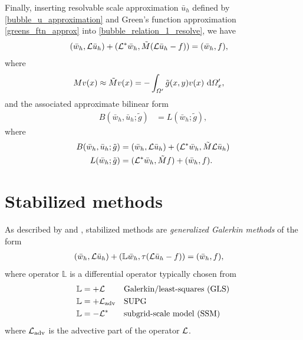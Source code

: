 Finally, inserting resolvable scale approximation $\bar{u}_h$ defined by \cref{bubble_u_approximation} and Green's function approximation \cref{greens_ftn_approx} into \cref{bubble_relation_1_resolve}, we have
\begin{align}
  \label{bubble_relation_1_resolve_approx}
  (\bar{w}_h, \mathcal{L} \bar{u}_h) + (\mathcal{L}^* \bar{w}_h, \tilde{M}(\mathcal{L}\bar{u}_h - f)) &= (\bar{w}_h, f),
\end{align}
where
\begin{align*}
  M v(x) \approx \tilde{M} v(x) &= - \int_{\varOmega'} \tilde{g}(x,y) v(x) \ \mathrm{d}\varOmega_x',
\end{align*}
and the associated approximate bilinear form
\begin{align*}
  B(\bar{w}_h, \bar{u}_h; \tilde{g}) &= L(\bar{w}_h; \tilde{g}),
\end{align*}
where
\begin{align*}
  B(\bar{w}_h, \bar{u}_h; \tilde{g}) &= (\bar{w}_h, \mathcal{L} \bar{u}_h) + (\mathcal{L}^* \bar{w}_h, \tilde{M} \mathcal{L}\bar{u}_h) \\
  L(\bar{w}_h; \tilde{g}) &= (\mathcal{L}^* \bar{w}_h, \tilde{M}f) + (\bar{w}_h, f).
\end{align*}




\section{Stabilized methods} \label{ssn_stabilized_methods}

As described by \citet{hughes_1995} and \citet{codina_1992}, stabilized methods are \emph{generalized Galerkin methods} of the form
\begin{align}
  \label{generalized_form}
  (\bar{w}_h, \mathcal{L} \bar{u}_h) + (\mathbb{L} \bar{w}_h, \tau(\mathcal{L}\bar{u}_h - f)) &= (\bar{w}_h, f),
\end{align}
where operator $\mathbb{L}$ is a differential operator typically chosen from
\begin{align}
  \label{bubble_gls_operator}
  \mathbb{L} &= + \mathcal{L} && \text{Galerkin/least-squares (GLS)} \\
  \label{bubble_supg_operator}
  \mathbb{L} &= + \mathcal{L}_{\text{adv}} && \text{SUPG} \\
  \label{bubble_ssm_operator}
  \mathbb{L} &= - \mathcal{L}^* && \text{subgrid-scale model (SSM)}
\end{align}
where $\mathcal{L}_{\text{adv}}$ is the advective part of the operator $\mathcal{L}$.

